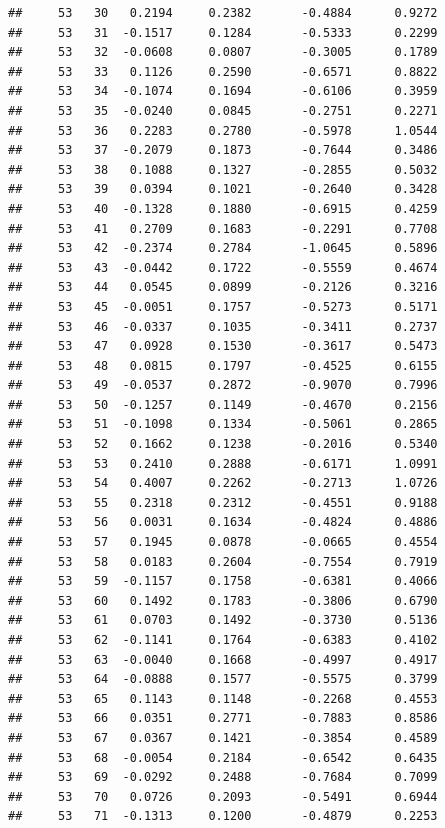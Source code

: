 \documentclass[
]{article}
\begin{document}
\begin{verbatim}
##     53   30   0.2194     0.2382       -0.4884      0.9272  
##     53   31  -0.1517     0.1284       -0.5333      0.2299  
##     53   32  -0.0608     0.0807       -0.3005      0.1789  
##     53   33   0.1126     0.2590       -0.6571      0.8822  
##     53   34  -0.1074     0.1694       -0.6106      0.3959  
##     53   35  -0.0240     0.0845       -0.2751      0.2271  
##     53   36   0.2283     0.2780       -0.5978      1.0544  
##     53   37  -0.2079     0.1873       -0.7644      0.3486  
##     53   38   0.1088     0.1327       -0.2855      0.5032  
##     53   39   0.0394     0.1021       -0.2640      0.3428  
##     53   40  -0.1328     0.1880       -0.6915      0.4259  
##     53   41   0.2709     0.1683       -0.2291      0.7708  
##     53   42  -0.2374     0.2784       -1.0645      0.5896  
##     53   43  -0.0442     0.1722       -0.5559      0.4674  
##     53   44   0.0545     0.0899       -0.2126      0.3216  
##     53   45  -0.0051     0.1757       -0.5273      0.5171  
##     53   46  -0.0337     0.1035       -0.3411      0.2737  
##     53   47   0.0928     0.1530       -0.3617      0.5473  
##     53   48   0.0815     0.1797       -0.4525      0.6155  
##     53   49  -0.0537     0.2872       -0.9070      0.7996  
##     53   50  -0.1257     0.1149       -0.4670      0.2156  
##     53   51  -0.1098     0.1334       -0.5061      0.2865  
##     53   52   0.1662     0.1238       -0.2016      0.5340  
##     53   53   0.2410     0.2888       -0.6171      1.0991  
##     53   54   0.4007     0.2262       -0.2713      1.0726  
##     53   55   0.2318     0.2312       -0.4551      0.9188  
##     53   56   0.0031     0.1634       -0.4824      0.4886  
##     53   57   0.1945     0.0878       -0.0665      0.4554  
##     53   58   0.0183     0.2604       -0.7554      0.7919  
##     53   59  -0.1157     0.1758       -0.6381      0.4066  
##     53   60   0.1492     0.1783       -0.3806      0.6790  
##     53   61   0.0703     0.1492       -0.3730      0.5136  
##     53   62  -0.1141     0.1764       -0.6383      0.4102  
##     53   63  -0.0040     0.1668       -0.4997      0.4917  
##     53   64  -0.0888     0.1577       -0.5575      0.3799  
##     53   65   0.1143     0.1148       -0.2268      0.4553  
##     53   66   0.0351     0.2771       -0.7883      0.8586  
##     53   67   0.0367     0.1421       -0.3854      0.4589  
##     53   68  -0.0054     0.2184       -0.6542      0.6435  
##     53   69  -0.0292     0.2488       -0.7684      0.7099  
##     53   70   0.0726     0.2093       -0.5491      0.6944  
##     53   71  -0.1313     0.1200       -0.4879      0.2253  

\end{verbatim}
\end{document}
